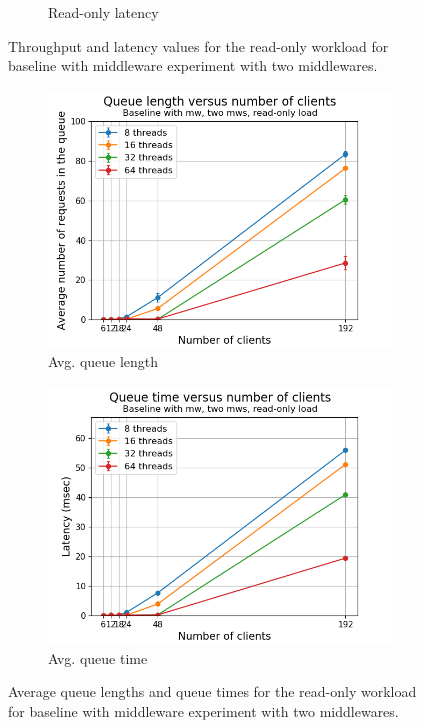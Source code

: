 \documentclass[11pt,a4paper]{article}
\begin{document}
\begin{figure}[h]
\begin{subfigure}{.5\textwidth}
  \caption{Read-only latency}
  \label{fig:mwb2-ro-lat_mw}
\end{subfigure}
\caption{Throughput and latency values for the read-only workload for baseline with middleware experiment with two middlewares.}
\label{fig:mwb2-ro_mw}
\end{figure}

\begin{figure}[h]
\centering
\begin{subfigure}{.5\textwidth}
  \centering
  \includegraphics[width=1.0\linewidth,trim={5px 0px 20px 0px},clip]{img/plot/mwb2-ro-qlen_mw.png}
  \caption{Avg. queue length}
  \label{fig:mwb2-ro-qlen_mw}
\end{subfigure}%
\begin{subfigure}{.5\textwidth}
  \centering
  \includegraphics[width=1.0\linewidth,trim={5px 0px 20px 0px},clip]{img/plot/mwb2-ro-qtime_mw.png}
  \caption{Avg. queue time}
  \label{fig:mwb2-ro-qtime_mw}
\end{subfigure}
\caption{Average queue lengths and queue times for the read-only workload for baseline with middleware experiment with two middlewares.}
\label{fig:mwb2-ro-qstats}
\end{figure}
\end{document}
